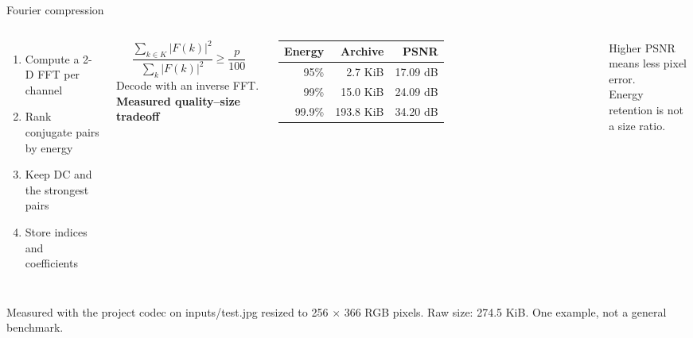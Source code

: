 \documentclass[aspectratio=169,11pt]{beamer}
\newcommand{\topic}[1]{{\color{Teal}\bfseries #1}}
\newcommand{\muted}[1]{{\color{Muted}#1}}
\begin{document}
\begin{frame}{Fourier compression}
\begin{columns}[T,onlytextwidth]
\begin{enumerate}\setlength\itemsep{2mm}
\item Compute a 2-D FFT per channel
\item Rank conjugate pairs by energy
\item Keep DC and the strongest pairs
\item Store indices and coefficients
\end{enumerate}
\vspace{2mm}
\[\frac{\sum_{k\in K}|F(k)|^2}{\sum_k|F(k)|^2}\geq \frac{p}{100}\]
\muted{Decode with an inverse FFT.}
\topic{Measured quality--size tradeoff}\par\vspace{3mm}
\small
\renewcommand{\arraystretch}{1.35}
\begin{tabular}{@{}rrr@{}}
\toprule
\textbf{Energy} & \textbf{Archive} & \textbf{PSNR}\\
\midrule
95\% & 2.7 KiB & 17.09 dB\\
99\% & 15.0 KiB & 24.09 dB\\
99.9\% & 193.8 KiB & 34.20 dB\\
\bottomrule
\end{tabular}
\par\vspace{4mm}
\muted{Higher PSNR means less pixel error.\\Energy retention is not a size ratio.}
\end{columns}
\vspace{5mm}
{\scriptsize\muted{Measured with the project codec on inputs/test.jpg resized to 256 $\times$ 366 RGB pixels. Raw size: 274.5 KiB. One example, not a general benchmark.}}
\end{frame}
\end{document}
